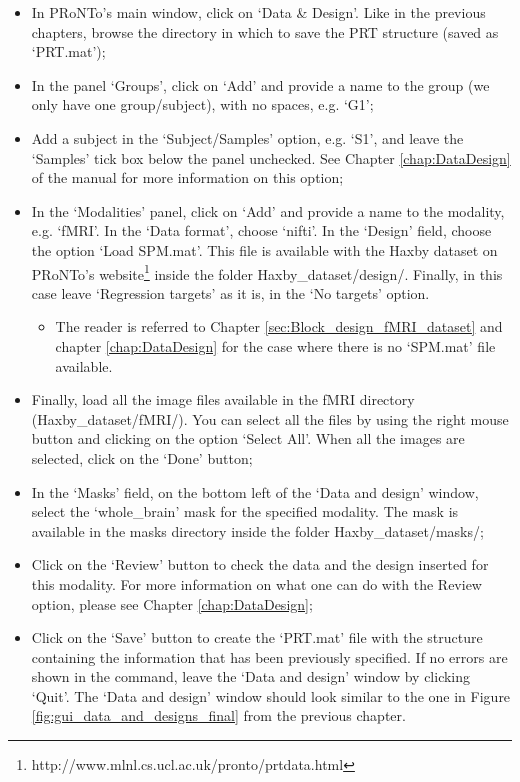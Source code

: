 \begin{itemize}
	
	\item In PRoNTo's main window, click on `Data \& Design'. Like in the previous chapters, browse the directory in which to save the PRT structure (saved as `PRT.mat');
	
	\item In the panel `Groups', click on `Add' and provide a name to the group (we only have one group/subject), with no spaces, e.g. `G1';
	
	\item Add a subject in the `Subject/Samples' option, e.g. `S1', and leave the `Samples' tick box below the panel unchecked. See Chapter \ref{chap:DataDesign} of the manual for more information on this option;
	
	\item In the `Modalities' panel, click on `Add' and provide a name to the modality, e.g. `fMRI'. In the `Data format', choose `nifti'. In the `Design' field, choose the option `Load SPM.mat'. This file is available with the Haxby dataset on PRoNTo's website\footnote{http://www.mlnl.cs.ucl.ac.uk/pronto/prtdata.html} inside the folder Haxby\_dataset/design/. Finally, in this case leave `Regression targets' as it is, in the `No targets' option.
	

	\begin{itemize}
		
		\item The reader is referred to Chapter \ref{sec:Block_design_fMRI_dataset} and chapter \ref{chap:DataDesign} for the case where there is no `SPM.mat' file available.
	
	\end{itemize}
	
	
	\item Finally, load all the image files available in the fMRI directory (Haxby\_dataset/fMRI/). You can select all the files by using the right mouse button and clicking on the option `Select All'. When all the images are selected, click on the `Done' button;
	
	\item In the `Masks' field, on the bottom left of the `Data and design' window, select the `whole\_brain' mask for the specified modality. The mask is available in the masks directory inside the folder Haxby\_dataset/masks/;

	\item Click on the `Review' button to check the data and the design inserted for this modality. For more information on what one can do with the Review option, please see Chapter \ref{chap:DataDesign};
	
	\item Click on the `Save' button to create the `PRT.mat' file with the structure containing the information that has been previously specified. If no errors are shown in the \matlab{} command, leave the `Data and design' window by clicking `Quit'. The `Data and design' window should look similar to the one in Figure \ref{fig:gui_data_and_designs_final} from the previous chapter.
	
\end{itemize}

